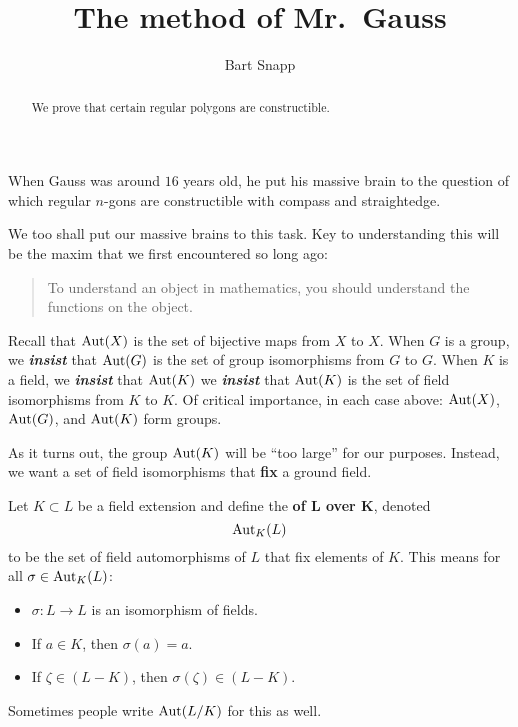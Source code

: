 \documentclass{ximera}
\title{The method of Mr.\ Gauss}
\author{Bart Snapp}
\begin{document}
\begin{abstract}
  We prove that certain regular polygons are constructible.
\end{abstract}
\maketitle

When Gauss was around $16$ years old, he put his massive brain to the
question of which regular $n$-gons are constructible with compass and
straightedge.


We too shall put our massive brains to this task. Key to understanding
this will be the maxim that we first encountered so long ago:
\begin{quote}
  To understand an object in mathematics, you should understand the
  functions on the object.
\end{quote}
Recall that $\operatorname{Aut}(X)$ is the set of bijective maps
from $X$ to $X$. When $G$ is a group, we \textit{\bfseries insist}
that $\operatorname{Aut}(G)$ is the set of group isomorphisms from $G$ to $G$. When
$K$ is a field, we \textit{\textbf{insist}} that $\operatorname{Aut}(K)$ we
\textit{\textbf{insist}} that $\operatorname{Aut}(K)$ is the set of field
isomorphisms from $K$ to $K$. Of critical importance, in each case
above: $\operatorname{Aut}(X)$, $\operatorname{Aut}(G)$, and $\operatorname{Aut}(K)$ form groups.



As it turns out, the group $\operatorname{Aut}(K)$ will be ``too large'' for our
purposes. Instead, we want a set of field isomorphisms that
\textbf{fix} a ground field.


\begin{definition}
  Let $K\subset L$ be a field extension and define the
  \textbf{ of $\boldsymbol L$ over
    $\boldsymbol K$}, denoted
  \[
  \aut_K(L)\index{autKL@$\aut_K(L)$}
  \]
  to be the set of field automorphisms of $L$ that fix elements of
  $K$. This means for all $\sigma \in \operatorname{Aut}_K(L)$:
  \begin{itemize}
  \item $\sigma: L\to L$ is an isomorphism of fields.
  \item If $a\in K$, then $\sigma(a) = a$.
  \item If $\zeta\in (L - K)$, then $\sigma(\zeta) \in (L-K)$.
  \end{itemize}
  Sometimes people write $\operatorname{Aut}(L/K)$ for
  this as well.
\end{definition}
\end{document}
